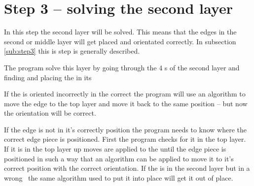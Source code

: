 \section{Step 3 -- solving the second layer}
In this step the second layer will be solved. 
This means that the edges in the second or middle layer will get placed and orientated correctly. 
In subsection \ref{sub:step3} this is step is generally described. 

The program solve this layer by going through the 4 \cubicle{}s of the second layer and finding and placing the \cpiece{} in its \cubicle{}

If the \cpiece is oriented incorrectly in the correct \cubicle{} the program will use an algorithm to move the edge \cpiece{} to the top layer and move it back to the same position -- but now the orientation will be correct. 

If the edge \cpiece{} is not in it's correctly position the program needs to know where the correct edge piece is positioned. First the program checks for it in the top layer. 
If it is in the top layer up moves are applied to the \rubik{} until the edge piece is positioned in such a way that an algorithm can be applied to move it to it's correct position with the correct orientation. 
If the \cpiece{} is in the second layer but in a wrong \cubicle{} the same algorithm used to put it into place will get it out of place. 


